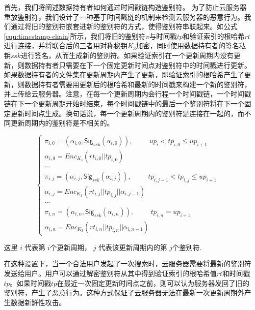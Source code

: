 首先，我们将阐述数据持有者如何通过时间戳链构造鉴别符。
为了防止云服务器重放鉴别符，我们设计了一种基于时间戳链的机制来检测云服务器的恶意行为。我们通过将旧的鉴别符嵌套进新的鉴别符的方式，使得鉴别符串联起来。如公式\ref{equ:timestamp-chain}所示，我们将旧的鉴别符$\pi$与时间戳$tp$和验证索引的根哈希$rt$进行连接，并将联合后的三者用对称秘钥$K_3$加密，同时使用数据持有者的签名私钥$ssk$进行签名，从而生成新的鉴别符。如果验证索引在一个更新周期内没有更新，则数据持有者只需要在下一个固定更新时间点对鉴别符中的时间戳进行更新。如果数据持有者的文件集在更新周期内产生了更新，即验证索引的根哈希产生了更新，则数据持有者需要用更新后的根哈希和最新的时间戳来构建一个新的鉴别符，并上传给云服务器。注意，在每一个更新周期内会行程一个时间戳链，一个时间戳链在下一个更新周期开始时结束，每个时间戳链中的最后一个鉴别符将在下一个固定更新时间点生成。换句话说，每一个更新周期内的鉴别符是连接在一起的，而不同更新周期内的鉴别符是不相关的。


\begin{equation}
  \label{equ:timestamp-chain}
    \left\{
    \begin{array}{ll} %
      \pi_{i, 0} = (\alpha_{i, 0}, \mathsf{Sig}_{ssk}(\alpha_{i, 0})),~~~~~~~~~~~up_i < tp_{i, 0} \leq up_{i+1} \\
      \alpha_{i, 0} = Enc_{K_3}(rt_{i, 0}||tp_{i, 0}) \\
      \cdots \\

     \pi_{i, j} = (\alpha_{i, j}, \mathsf{Sig}_{ssk}(\alpha_{i, j})),~~~~~~~~~~~tp_{i, j-1} < tp_{i, j} \leq up_{i+1}  \\
     \alpha_{i, j} = Enc_{K_3}(rt_{i, j}||tp_{i, j}||\alpha_{i, j-1}) \\
      \cdots  \\
     \pi_{i, n} = (\alpha_{i, n}, \mathsf{Sig}_{ssk}(\alpha_{i, n})),~~~~~~~~~~~tp_{i, n}=up_{i+1} \\
     \alpha_{i, n} = Enc_{K_3}(rt_{i, n}||tp_{i, n}||\alpha_{i, n-1})
    \end{array}
    \right.
  \end{equation}

\noindent 这里 $i$ 代表第 $i$个更新周期， $j$ 代表该更新周期内的第 $j$个鉴别符.

在这种设置下，当一个合法用户发起了一次搜索时，云服务器需要将最新的鉴别符发送给用户。用户可以通过解密鉴别符从其中得到验证索引的根哈希值$rt$和时间戳$tp$。如果时间戳$tp$在最近一次固定更新时间点之前，则可以认为服务器发回了旧的鉴别符，产生了恶意行为。这种方式保证了云服务器无法在最新一次更新周期外产生数据新鲜性攻击。

